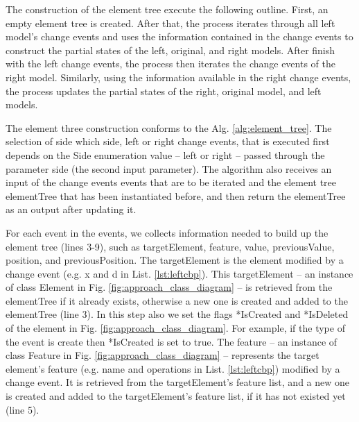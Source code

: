 \documentclass{llncs}
\begin{document}
The construction of the element tree execute the following outline. First, an empty element tree is created. After that, the process iterates through all left model's change events and uses the information contained in the change events to construct the partial states of the left, original, and right models. After finish with the left change events, the process then iterates the change events of the right model. Similarly, using the information available in the right change events, the process updates the partial states of the right, original model, and left models. 

The element three construction conforms to the Alg. \ref{alg:element_tree}. The selection of side which side, left or right change events, that is executed first depends on the \textsf{Side} enumeration value -- \textsf{left} or \textsf{right} -- passed through the parameter \textsf{side} (the second input parameter). The algorithm also receives an input of the change events \textsf{events} that are to be iterated and the element tree \textsf{elementTree} that has been instantiated before, and then return the \textsf{elementTree} as an output after updating it.

For each \textsf{event} in the \textsf{events}, we collects information needed to build up the element tree (lines 3-9), such as \textsf{targetElement}, \textsf{feature}, \textsf{value}, \textsf{previousValue}, \textsf{position}, and \textsf{previousPosition}. The \textsf{targetElement} is the element modified by a change event (e.g. \textsf{x} and \textsf{d} in List. \ref{lst:leftcbp}). This \textsf{targetElement} -- an instance of class Element in Fig. \ref{fig:approach_class_diagram} -- is retrieved from the \textsf{elementTree} if it already exists, otherwise a new one is created and added to the \textsf{elementTree} (line 3). In this step also we set the flags \textsf{*IsCreated} and \textsf{*IsDeleted} of the element in Fig. \ref{fig:approach_class_diagram}. For example, if the type of the event is \textsf{create} then \textsf{*IsCreated} is set to \textsf{true}. The \textsf{feature} -- an instance of class Feature in Fig. \ref{fig:approach_class_diagram} -- represents the target element's feature (e.g. \textsf{name} and \textsf{operations} in List. \ref{lst:leftcbp}) modified by a change event. It is  retrieved from the \textsf{targetElement}'s feature list, and a new one is created and added to the \textsf{targetElement}'s feature list, if it has not existed yet (line 5). 
\end{document}

